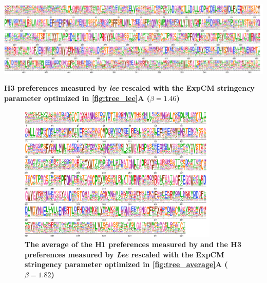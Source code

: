 \documentclass[11pt]{article}
\begin{document}
\begin{suppfig}[H]
\centerline{\includegraphics[width=\textwidth]{figures/prefs_lee}}
\caption{\label{suppfig:prefs_lee}
\textbf{H3 preferences measured by \textit{lee} rescaled with the ExpCM stringency parameter optimized in \ref{fig:tree_lee}A  ($\beta = 1.46$)} 
}
\end{suppfig}

\begin{figure}[H]
\centerline{\includegraphics[width=0.85\textwidth]{figures/prefs_average}}
\caption{\label{fig:prefs_average}
\textbf{The average of the H1 preferences measured by \cite{doud2016accurate} and the H3 preferences measured by \textit{Lee} rescaled with the ExpCM stringency parameter optimized in \ref{fig:tree_average}A  ($\beta = 1.82$)}}
\end{figure}
\end{document}
